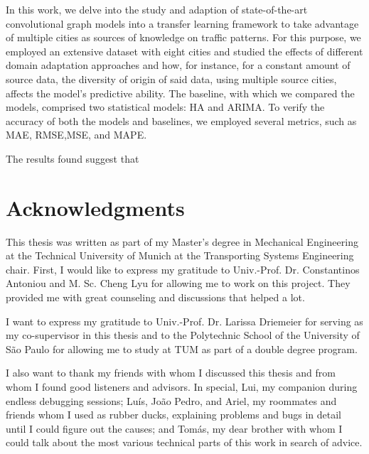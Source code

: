 In this work, we delve into the study and adaption of state-of-the-art convolutional graph models into a transfer learning framework to take advantage of multiple cities as sources of knowledge on traffic patterns. For this purpose, we employed an extensive dataset with eight cities and studied the effects of different domain adaptation approaches and how, for instance, for a constant amount of source data, the diversity of origin of said data, using multiple source cities, affects the model's predictive ability. The baseline, with which we compared the models, comprised two statistical models: \gls{HA} and \gls{ARIMA}. To verify the accuracy of both the models and baselines, we employed several metrics, such as \gls{MAE}, \gls{RMSE},\gls{MSE}, and \gls{MAPE}.

The results found suggest that





\chapter*{Acknowledgments}

This thesis was written as part of my Master's degree in Mechanical Engineering at the Technical University of Munich at the Transporting Systems Engineering chair. First, I would like to express my gratitude to Univ.-Prof. Dr. Constantinos Antoniou and M. Sc. Cheng Lyu for allowing me to work on this project. They provided me with great counseling and discussions that helped a lot.

I want to express my gratitude to Univ.-Prof. Dr. Larissa Driemeier for serving as my co-supervisor in this thesis and to the Polytechnic School of the University of São Paulo for allowing me to study at TUM as part of a double degree program.

I also want to thank my friends with whom I discussed this thesis and from whom I found good listeners and advisors. In special, Lui, my companion during endless debugging sessions; Luís, João Pedro, and Ariel, my roommates and friends whom I used as rubber ducks, explaining problems and bugs in detail until I could figure out the causes; and Tomás, my dear brother with whom I could talk about the most various technical parts of this work in search of advice.

